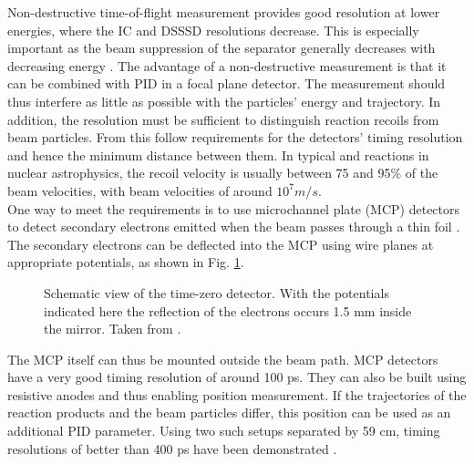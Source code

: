 Non-destructive time-of-flight measurement provides good resolution at lower energies, where the IC and DSSSD resolutions decrease. This is especially important as the beam suppression of the separator generally decreases with decreasing energy \cite{hutc08}. The advantage of a non-destructive measurement is that it can be combined with PID in a focal plane detector. The measurement should thus interfere as little as possible with the particles' energy and trajectory. In addition, the resolution must be sufficient to distinguish reaction recoils from beam particles. From this follow requirements for the detectors' timing resolution and hence the minimum distance between them. In typical  and \reac{\alpha}{\gamma} reactions in nuclear astrophysics, the recoil velocity is usually between 75 and 95\% of the beam velocities, with beam velocities of around $10^7 \unit{m/s}$.   \\
One way to meet the requirements is to use microchannel plate (MCP) detectors to detect secondary electrons emitted when the beam passes through a thin foil \cite{star82}. The secondary electrons can be deflected into the MCP using wire planes at appropriate potentials, as shown in Fig. \ref{fig:Starzecki82_Fig1}.
%
\begin{figure}
\centering
{}
\caption{Schematic view of the time-zero detector. With the potentials indicated here the reflection of the electrons occurs 1.5 mm inside the mirror. Taken from \cite{star82}.}
\label{fig:Starzecki82_Fig1}
\end{figure}%
%
The MCP itself can thus be mounted outside the beam path. MCP detectors have a very good timing resolution of around 100 ps. They can also be built using resistive anodes and thus enabling position measurement. If the trajectories of the reaction products and the beam particles differ, this position can be used as an additional PID parameter. Using two such setups separated by 59 cm, timing resolutions of better than 400 ps have been demonstrated \cite{vock09}. \\
